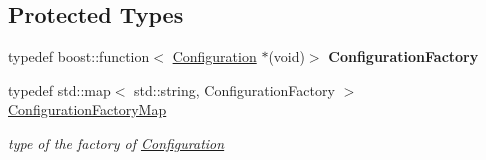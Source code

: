 \subsection*{Protected Types}
\begin{DoxyCompactItemize}
\item 
\mbox{\label{class_s_m_spp__di__unipi__it_1_1_configuration_a0e356c9d7245f238774a60556fbfb323}} 
typedef boost\+::function$<$ \mbox{\hyperlink{class_s_m_spp__di__unipi__it_1_1_configuration}{Configuration}} $\ast$(void)$>$ {\bfseries Configuration\+Factory}
\item 
\mbox{\label{class_s_m_spp__di__unipi__it_1_1_configuration_aee2d0ed361f8089096aa45ffa2f07bed}} 
typedef std\+::map$<$ std\+::string, Configuration\+Factory $>$ \mbox{\hyperlink{class_s_m_spp__di__unipi__it_1_1_configuration_aee2d0ed361f8089096aa45ffa2f07bed}{Configuration\+Factory\+Map}}
\begin{DoxyCompactList}\small\item\em type of the factory of \mbox{\hyperlink{class_s_m_spp__di__unipi__it_1_1_configuration}{Configuration}} \end{DoxyCompactList}\end{DoxyCompactItemize}
